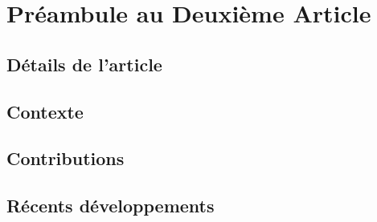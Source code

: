 \chapter{Pr\'{e}ambule au Deuxi\`{e}me Article }

\section{D\'{e}tails de l'article}

\section{Contexte}

\section{Contributions}

\section{R\'{e}cents d\'{e}veloppements}

